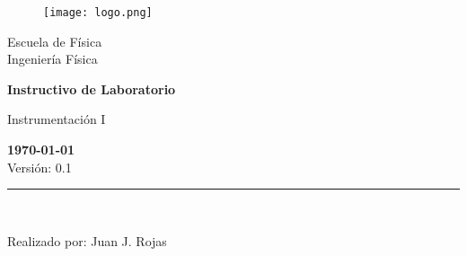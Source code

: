 \documentclass[12pt,letterpaper]{report}
\begin{document}
\begin{titlepage}
    \begin{center}
\vspace*{1in}
\begin{figure}[htb]
\begin{center}
\texttt{[image: logo.png]}
\end{center}
\end{figure}
\vspace*{0.4in}
\begin{Large}
Escuela de Física\\
\vspace*{0.15in}
Ingeniería Física\\
\vspace*{0.8in}
\end{Large}
\vspace*{0.2in}
\begin{Large}
\textbf{Instructivo de Laboratorio} \\
\end{Large}
\vspace*{0.3in}
\begin{large}
Instrumentación I\\
\end{large}
\vspace*{2.5in}
\begin{Large}
\textbf{\today}\\
Versión: 0.1\\
\end{Large}
\rule{80mm}{0.1mm}\\
\vspace*{0.1in}
\begin{large}
Realizado por: Juan J. Rojas\\
\end{large}
\end{center}
\end{titlepage}
\tableofcontents

% 
% 
% 
\end{document}
